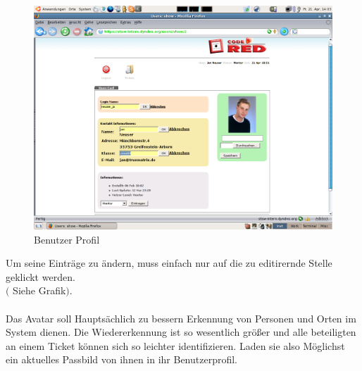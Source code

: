 \newpage
\begin{figure}[h]
\begin{center}
   \includegraphics[width=450pt]{../bilder/profil_edit.png}
   \caption{Benutzer Profil}
   \label{Benutzer Profil}
\end{center}
\end{figure}
Um seine Einträge zu ändern, muss einfach nur auf die zu editirernde Stelle geklickt werden.\\
$($ Siehe Grafik$)$.\\
\\
Das Avatar soll Hauptsächlich zu bessern Erkennung von Personen und Orten im System dienen. Die Wiedererkennung ist so wesentlich größer und alle beteiligten an einem Ticket können sich so leichter identifizieren. Laden sie also Möglichst ein aktuelles Passbild von ihnen in ihr Benutzerprofil.\\
\\




   
